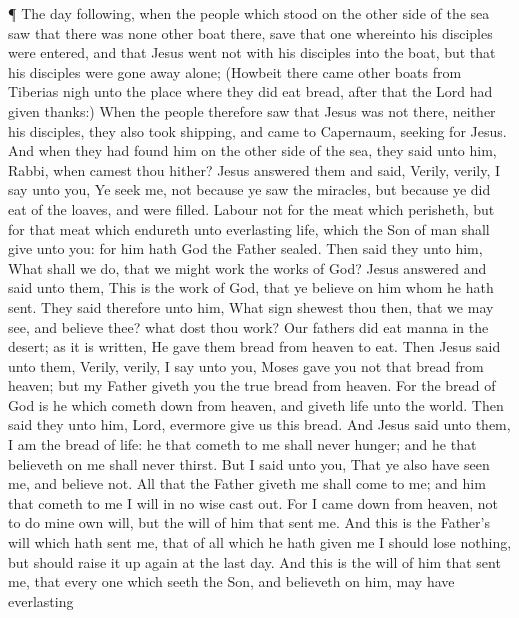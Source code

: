  ¶ The day following, when the people which stood on the
other side of the sea saw that there was none other boat there, save
that one whereinto his disciples were entered, and that Jesus went not
with his disciples into the boat, but that his disciples were gone away
alone;  (Howbeit there came other boats from Tiberias nigh
unto the place where they did eat bread, after that the Lord had given
thanks:)  When the people therefore saw that Jesus was not
there, neither his disciples, they also took shipping, and came to
Capernaum, seeking for Jesus.  And when they had found him
on the other side of the sea, they said unto him, Rabbi, when camest
thou hither?  Jesus answered them and said, Verily, verily,
I say unto you, Ye seek me, not because ye saw the miracles, but because
ye did eat of the loaves, and were filled.  Labour not for
the meat which perisheth, but for that meat which endureth unto
everlasting life, which the Son of man shall give unto you: for him hath
God the Father sealed.  Then said they unto him, What shall
we do, that we might work the works of God?  Jesus answered
and said unto them, This is the work of God, that ye believe on him whom
he hath sent.  They said therefore unto him, What sign
shewest thou then, that we may see, and believe thee? what dost thou
work?  Our fathers did eat manna in the desert; as it is
written, He gave them bread from heaven to eat.  Then Jesus
said unto them, Verily, verily, I say unto you, Moses gave you not that
bread from heaven; but my Father giveth you the true bread from heaven.
 For the bread of God is he which cometh down from heaven,
and giveth life unto the world.  Then said they unto him,
Lord, evermore give us this bread.  And Jesus said unto
them, I am the bread of life: he that cometh to me shall never hunger;
and he that believeth on me shall never thirst.  But I said
unto you, That ye also have seen me, and believe not.  All
that the Father giveth me shall come to me; and him that cometh to me I
will in no wise cast out.  For I came down from heaven, not
to do mine own will, but the will of him that sent me.  And
this is the Father's will which hath sent me, that of all which he hath
given me I should lose nothing, but should raise it up again at the last
day.  And this is the will of him that sent me, that every
one which seeth the Son, and believeth on him, may have everlasting
